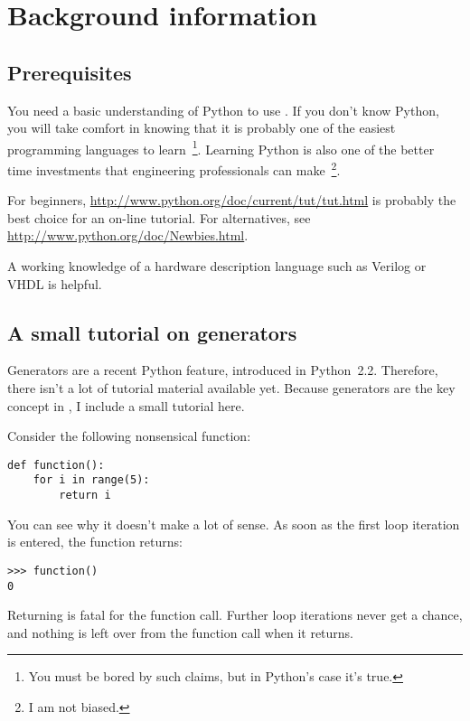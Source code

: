 \chapter{Background information \label{background}}

\section{Prerequisites \label{prerequisites}}

You need a basic understanding of Python to use \myhdl{}.
If you don't know Python, you will take comfort in knowing
that it is probably one of the easiest programming languages to
learn~\footnote{You must be bored by such claims, but in Python's
case it's true.}. Learning Python is also one of the better time
investments that engineering professionals can make~\footnote{I am not
biased.}.

For beginners, \url{http://www.python.org/doc/current/tut/tut.html} is
probably the best choice for an on-line tutorial. For alternatives,
see \url{http://www.python.org/doc/Newbies.html}.

A working knowledge of a hardware description language such as Verilog
or VHDL is helpful. 

\section{A small tutorial on generators \label{tutorial}}

Generators are a recent Python feature, introduced in
Python~2.2. Therefore, there isn't a lot of tutorial material
available yet. Because generators are the key concept in
\myhdl{}, I include a small tutorial here.

Consider the following nonsensical function:

\begin{verbatim}
def function():
    for i in range(5):
        return i
\end{verbatim}

You can see why it doesn't make a lot of sense. As soon as the first
loop iteration is entered, the function returns:

\begin{verbatim}
>>> function()
0
\end{verbatim}

Returning is fatal for the function call. Further loop iterations
never get a chance, and nothing is left over from the function call
when it returns.


